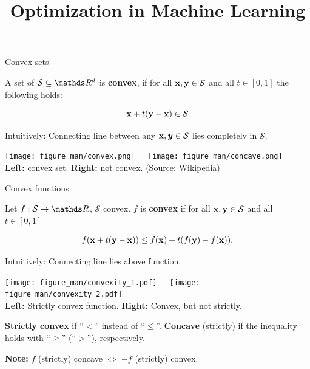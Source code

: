\documentclass[11pt,compress,t,notes=noshow, xcolor=table]{beamer}
\title{Optimization in Machine Learning}
\begin{document}


\begin{vbframe}{Convex sets}

A set of $\mathcal{S} \subseteq \R^d$ is \textbf{convex}, if for all $\mathbf{x}, \mathbf{y} \in \mathcal{S}$ and all $t \in [0, 1]$ the following holds:

$$
\mathbf{x} + t (\mathbf{y} - \mathbf{x}) \in \mathcal{S}
$$

Intuitively: Connecting line between any $\mathbf{x}, \bm{y} \in \mathcal{S}$ lies completely in $\mathcal{S}$.

\begin{center}
    \texttt{[image: figure\_man/convex.png]}~~~\texttt{[image: figure\_man/concave.png]} \\
    \footnotesize{
        \textbf{Left:} convex set.
        \textbf{Right:} not convex. (Source: Wikipedia)}
\end{center}

\end{vbframe}

\begin{vbframe}{Convex functions}

Let $f: \mathcal{S} \to \R$, $\mathcal{S}$ convex.
$f$ is \textbf{convex} if for all $\mathbf{x}, \mathbf{y} \in \mathcal{S}$ and all $t \in [0, 1]$

\vspace{-0.5\baselineskip}

\begin{equation*}
    f(\mathbf{x} + t(\mathbf{y} - \mathbf{x})) \le f(\mathbf{x}) + t(f(\mathbf{y}) - f(\mathbf{x})).
\end{equation*}

Intuitively: Connecting line lies above function.

\begin{center}
    \texttt{[image: figure\_man/convexity\_1.pdf]}~~~\texttt{[image: figure\_man/convexity\_2.pdf]} \\
    \footnotesize{
        \textbf{Left:} Strictly convex function.
        \textbf{Right:} Convex, but not strictly. }
\end{center}

\textbf{Strictly convex} if \enquote{$<$} instead of \enquote{$\le$}. \textbf{Concave} (strictly) if the inequality holds with \enquote{$\ge$} (\enquote{$>$}), respectively.

\vspace*{0.2cm}

\textbf{Note:} $f$ (strictly) concave $\Leftrightarrow$ $-f$ (strictly) convex.



\end{vbframe}
\end{document}
